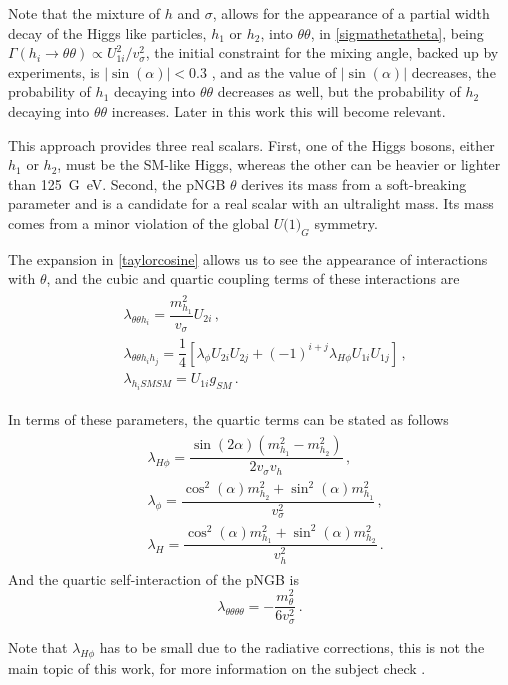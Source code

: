 Note that the mixture of $h$ and $\sigma$, allows for the appearance of a partial width decay of the Higgs like particles, $h_1$ or $h_2$, into $\theta\theta$, in \autoref{sigmathetatheta}, being $\Gamma(h_i\rightarrow\theta\theta)\propto U_{1i}^2/v_\sigma^2$, the initial constraint for the mixing angle, backed up by experiments, is $|\sin(\alpha)| < 0.3$ \cite{robens2021extended}, and as the value of $|\sin(\alpha)|$ decreases, the probability of $h_1$ decaying into $\theta\theta$ decreases as well, but the probability of $h_2$ decaying into $\theta\theta$ increases. Later in this work this will become relevant.

This approach provides three real scalars.
First, one of the Higgs bosons, either $h_1$ or $h_2$, must be the SM-like Higgs, whereas the other can be heavier or lighter than \SI{125}{G\eV}.
Second, the pNGB $\theta$ derives its mass from a soft-breaking parameter and is a candidate for a real scalar with an ultralight mass. Its mass comes from a minor violation of the global $U\textrm{(1)}_G$ symmetry\cite{Freitas_2021}. 

The expansion in \autoref{taylorcosine} allows us to see the appearance of interactions with $\theta$, and the cubic and quartic coupling terms of these interactions are \cite{Freitas_2021}
\begin{align}
	\label{couplingterms}
	\begin{array}{lll}
	&\lambda_{\theta\theta h_i}=\dfrac{m_{h_1}^2}{v_\sigma}U_{2i}\,,\\	[8pt]
	&\lambda_{\theta\theta h_i h_j}=\dfrac{1}{4}\left[\lambda_\phi U_{2i}U_{2j}+(-1)^{i+j}\lambda_{H\phi}U_{1i}U_{1j}\right]\,,\\ [8pt]
	&\lambda_{h_i SM SM}=U_{1i}g_{SM}\,.
	\end{array}
\end{align}

In terms of these parameters, the quartic terms can be stated as follows
\begin{align}
 \label{couplingtermsfrominteraction}
 \begin{array}{lll}
 	&\lambda_{H\phi}=\dfrac{\sin(2\alpha)(m_{h_1}^2-m_{h_2}^2)}{2v_\sigma v_h}\,, \\[8pt]	
 	&\lambda_{\phi}=\dfrac{\cos^2(\alpha)m_ {h_2}^2+\sin^2(\alpha)m_{h_1}^2}{v_\sigma^2}\,, \\[8pt]
 	&\lambda_{H}=\dfrac{\cos^2(\alpha)m_ {h_1}^2+\sin^2(\alpha)m_{h_2}^2}{v_h^2}\,.
 \end{array}
\end{align}
And the quartic self-interaction of the pNGB is
\begin{equation}
	\lambda_{\theta\theta\theta\theta}=-\dfrac{m_\theta^2}{6v_\sigma^2}\,.
\end{equation}

Note that $\lambda_{H\phi}$ has to be small due to the radiative corrections, this is not the main topic of this work, for more information on the subject check \cite{Freitas_2021}.